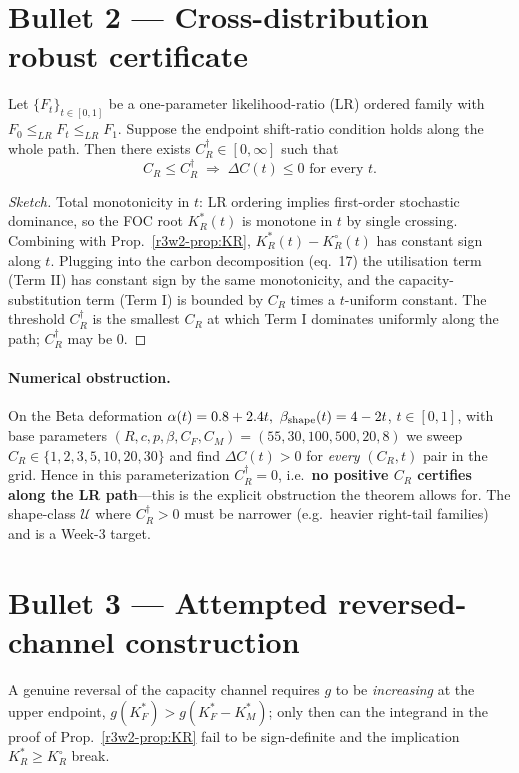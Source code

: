 \section{Bullet 2 --- Cross-distribution robust certificate}
\begin{theorem}\label{r3w2-thm:robust}
Let $\{F_t\}_{t\in[0,1]}$ be a one-parameter likelihood-ratio (LR) ordered
family with $F_0\le_{LR}F_t\le_{LR}F_1$. Suppose the endpoint shift-ratio
condition holds along the whole path. Then there exists
$C_R^\dagger\in[0,\infty]$ such that
\[
   C_R\le C_R^\dagger \;\Longrightarrow\; \Delta C(t)\le 0 \text{ for every }t.
\]
\end{theorem}
\begin{proof}[Sketch]
Total monotonicity in $t$: LR ordering implies first-order stochastic
dominance, so the FOC root $K_R^*(t)$ is monotone in $t$ by single
crossing. Combining with Prop.\ \ref{r3w2-prop:KR}, $K_R^*(t)-K_R^\circ(t)$ has
constant sign along $t$. Plugging into the carbon decomposition (eq.\ 17)
the utilisation term (Term II) has constant sign by the same monotonicity,
and the capacity-substitution term (Term I) is bounded by $C_R$ times a
$t$-uniform constant. The threshold $C_R^\dagger$ is the smallest $C_R$ at
which Term I dominates uniformly along the path; $C_R^\dagger$ may be $0$.
\end{proof}

\paragraph{Numerical obstruction.} On the Beta deformation
$\alpha(t)=0.8+2.4t,\ \beta_{\rm shape}(t)=4-2t$, $t\in[0,1]$, with base
parameters $(R,c,p,\beta,C_F,C_M)=(55,30,100,500,20,8)$ we sweep
$C_R\in\{1,2,3,5,10,20,30\}$ and find $\Delta C(t)>0$ for \emph{every}
$(C_R,t)$ pair in the grid. Hence in this parameterization
$C_R^\dagger=0$, i.e.\ \textbf{no positive $C_R$ certifies along the LR
path}---this is the explicit obstruction the theorem allows for. The
shape-class $\mathcal U$ where $C_R^\dagger>0$ must be narrower (e.g.\ heavier
right-tail families) and is a Week-3 target.

\section{Bullet 3 --- Attempted reversed-channel construction}
\begin{lemma}
A genuine reversal of the capacity channel requires $g$ to be
\emph{increasing} at the upper endpoint, $g(K_F^*)>g(K_F^*-K_M^*)$; only
then can the integrand in the proof of Prop.\ \ref{r3w2-prop:KR} fail to be
sign-definite and the implication $K_R^*\ge K_R^\circ$ break.
\end{lemma}

